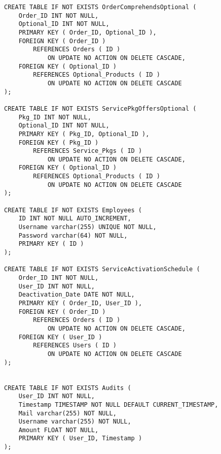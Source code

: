 \begin{lstlisting}[style=SQL]
CREATE TABLE IF NOT EXISTS OrderComprehendsOptional (
    Order_ID INT NOT NULL,
    Optional_ID INT NOT NULL,
    PRIMARY KEY ( Order_ID, Optional_ID ),
    FOREIGN KEY ( Order_ID )
        REFERENCES Orders ( ID )
            ON UPDATE NO ACTION ON DELETE CASCADE,
    FOREIGN KEY ( Optional_ID )
        REFERENCES Optional_Products ( ID )
            ON UPDATE NO ACTION ON DELETE CASCADE
);

CREATE TABLE IF NOT EXISTS ServicePkgOffersOptional (
    Pkg_ID INT NOT NULL,
    Optional_ID INT NOT NULL,
    PRIMARY KEY ( Pkg_ID, Optional_ID ),
    FOREIGN KEY ( Pkg_ID )
        REFERENCES Service_Pkgs ( ID )
            ON UPDATE NO ACTION ON DELETE CASCADE,
    FOREIGN KEY ( Optional_ID )
        REFERENCES Optional_Products ( ID )
            ON UPDATE NO ACTION ON DELETE CASCADE
);

CREATE TABLE IF NOT EXISTS Employees (
    ID INT NOT NULL AUTO_INCREMENT,
    Username varchar(255) UNIQUE NOT NULL,
    Password varchar(64) NOT NULL,
    PRIMARY KEY ( ID )
);

CREATE TABLE IF NOT EXISTS ServiceActivationSchedule (
    Order_ID INT NOT NULL,
    User_ID INT NOT NULL,
    Deactivation_Date DATE NOT NULL,
    PRIMARY KEY ( Order_ID, User_ID ),
    FOREIGN KEY ( Order_ID )
        REFERENCES Orders ( ID )
            ON UPDATE NO ACTION ON DELETE CASCADE,
    FOREIGN KEY ( User_ID )
        REFERENCES Users ( ID )
            ON UPDATE NO ACTION ON DELETE CASCADE
);


CREATE TABLE IF NOT EXISTS Audits (
    User_ID INT NOT NULL,
    Timestamp TIMESTAMP NOT NULL DEFAULT CURRENT_TIMESTAMP,
    Mail varchar(255) NOT NULL,
    Username varchar(255) NOT NULL,
    Amount FLOAT NOT NULL,
    PRIMARY KEY ( User_ID, Timestamp )
);


\end{lstlisting}



